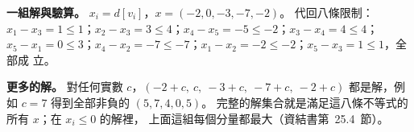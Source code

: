 \begin{pastsoln}
\textbf{一組解與驗算。} $x_i = d[v_i]$，$x = (-2, 0, -3, -7, -2)$。 代回八條限制：
$x_1 - x_3 = 1 \le 1$；$x_2 - x_3 = 3 \le 4$；$x_4 - x_5 = -5 \le -2$；$x_3 - x_4 = 4 \le 4$；
$x_5 - x_1 = 0 \le 3$；$x_4 - x_2 = -7 \le -7$；$x_1 - x_2 = -2 \le -2$；$x_5 - x_3 = 1 \le 1$，全部成
立。

\textbf{更多的解。} 對任何實數 $c$，$(-2 + c,\ c,\ -3 + c,\ -7 + c,\ -2 + c)$ 都是解，例如 $c = 7$
得到全部非負的 $(5, 7, 4, 0, 5)$。 完整的解集合就是滿足這八條不等式的所有 $x$；在 $x_i \le 0$ 的解裡，
上面這組每個分量都最大（資結書第~25.4~節）。
\end{pastsoln}
